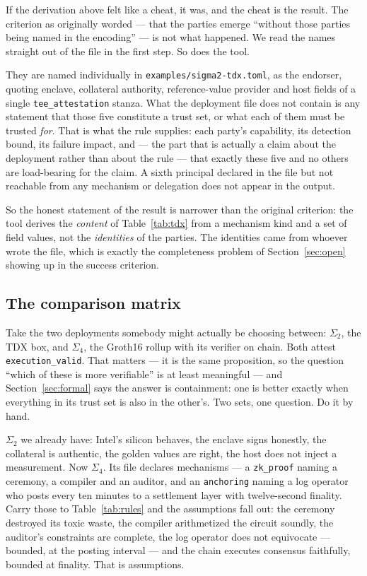 \documentclass[11pt]{article}
\newcommand{\ub}{\_\allowbreak}
\begin{document}
If the derivation above felt like a cheat, it was, and the cheat is the
result. The criterion as originally worded --- that the parties emerge
``without those parties being named in the encoding'' --- is not what
happened. We read the names straight out of the file in the first step. So
does the tool.

They are named individually in \texttt{examples/sigma2-tdx.toml}, as the
endorser, quoting enclave, collateral authority, reference-value provider and
host fields of a single \texttt{tee\ub attestation} stanza. What the
deployment file does not contain
is any statement that those five constitute a trust set, or what each of them
must be trusted \emph{for}. That is what the rule supplies: each party's
capability, its detection bound, its failure impact, and --- the part that is
actually a claim about the deployment rather than about the rule --- that
exactly these five and no others are load-bearing for the claim. A sixth
principal declared in the file but not reachable from any mechanism or
delegation does not appear in the output.

So the honest statement of the result is narrower than the original
criterion: the tool derives the \emph{content} of Table~\ref{tab:tdx} from a
mechanism kind and a set of field values, not the \emph{identities} of the
parties. The identities came from whoever wrote the file, which is exactly the
completeness problem of Section~\ref{sec:open} showing up in the success
criterion.

\subsection{The comparison matrix}

Take the two deployments somebody might actually be choosing between:
$\Sigma_2$, the TDX box, and $\Sigma_4$, the Groth16 rollup with its verifier
on chain. Both attest \texttt{execution\ub valid}. That matters --- it is the
same proposition, so the question ``which of these is more verifiable'' is at
least meaningful --- and Section~\ref{sec:formal} says the answer is
containment: one is better exactly when everything in its trust set is also
in the other's. Two sets, one question. Do it by hand.

$\Sigma_2$ we already have: Intel's silicon behaves, the enclave signs
honestly, the collateral is authentic, the golden values are right, the host
does not inject a measurement. Now $\Sigma_4$. Its file declares
\SigmaFourMechanisms{} mechanisms --- a \texttt{zk\ub proof} naming a
ceremony, a compiler and an
auditor, and an \texttt{anchoring} naming a log operator who posts every ten
minutes to a settlement layer with twelve-second finality. Carry those to
Table~\ref{tab:rules} and the assumptions fall out: the ceremony destroyed
its toxic waste, the compiler arithmetized the circuit soundly, the auditor's
constraints are complete, the log operator does not equivocate --- bounded,
at the posting interval --- and the chain executes consensus faithfully,
bounded at finality. That is \SigmaFourAssumptions{} assumptions.
\end{document}
